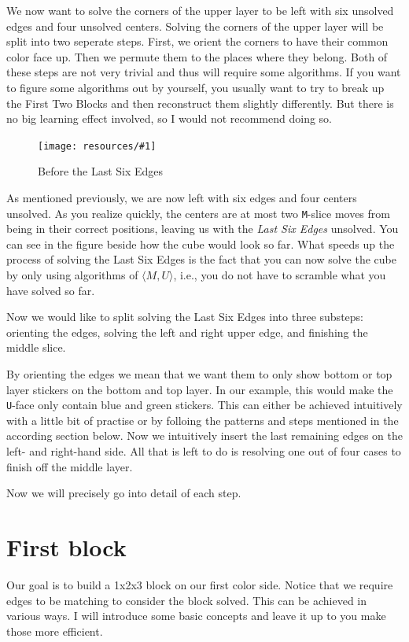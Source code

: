 \documentclass[a4paper]{scrreprt}
\newcommand{\img}[3]{
	\begin{figure}[ht]
	\centering
  \texttt{[image: resources/\#1]}
	\caption{#3}
	\end{figure}
}
\begin{document}
We now want to solve the corners of the upper layer to be left with six unsolved edges and four unsolved centers. Solving the corners of the upper layer will be split into two seperate steps. First, we orient the corners to have their common color face up. Then we permute them to the places where they belong. Both of these steps are not very trivial and thus will require some algorithms. If you want to figure some algorithms out by yourself, you usually want to try to break up the First Two Blocks and then reconstruct them slightly differently. But there is no big learning effect involved, so I would not recommend doing so.\par

\img{lse.png}{0.3}{Before the Last Six Edges}

As mentioned previously, we are now left with six edges and four centers unsolved. As you realize quickly, the centers are at most two \texttt{M}-slice moves from being in their correct positions, leaving us with the \emph{Last Six Edges} unsolved. You can see in the figure beside how the cube would look so far. What speeds up the process of solving the Last Six Edges is the fact that you can now solve the cube by only using algorithms of $\langle M, U\rangle$, i.e., you do not have to scramble what you have solved so far.\par

Now we would like to split solving the Last Six Edges into three substeps: orienting the edges, solving the left and right upper edge, and finishing the middle slice.\par

By orienting the edges we mean that we want them to only show bottom or top layer stickers on the bottom and top layer. In our example, this would make the \texttt{U}-face only contain blue and green stickers. This can either be achieved intuitively with a little bit of practise or by folloing the patterns and steps mentioned in the according section below. Now we intuitively insert the last remaining edges on the left- and right-hand side. All that is left to do is resolving one out of four cases to finish off the middle layer.\par

Now we will precisely go into detail of each step.

\section{First block}
Our goal is to build a 1x2x3 block on our first color side. Notice that we require edges to be matching to consider the block solved. This can be achieved in various ways. I will introduce some basic concepts and leave it up to you make those more efficient.\par
\end{document}
